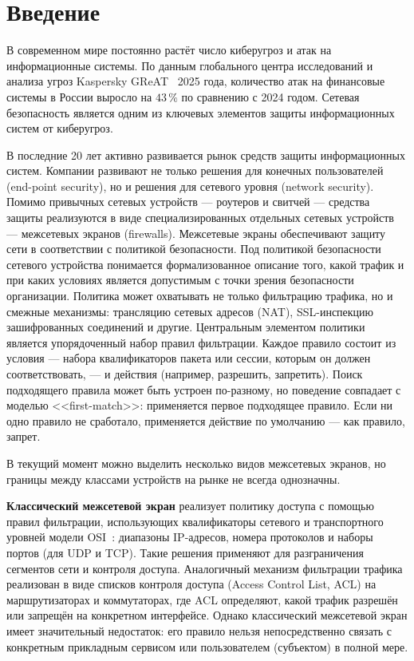 \section{Введение}
\label{sec:Section0} 

В современном мире постоянно растёт число киберугроз и атак на информационные системы. По данным глобального центра исследований и анализа угроз Kaspersky GReAT~\cite{kaspersky2025financial} 2025 года, количество атак на финансовые системы в России выросло на $43\,\%$ по сравнению с 2024 годом. Сетевая безопасность является одним из ключевых элементов защиты информационных систем от киберугроз.

В последние 20 лет активно развивается рынок средств защиты информационных систем. Компании развивают не только решения для конечных пользователей (end-point security), но и решения для сетевого уровня (network security). Помимо привычных сетевых устройств --- роутеров и свитчей --- средства защиты реализуются в виде специализированных отдельных сетевых устройств --- межсетевых экранов (firewalls). Межсетевые экраны обеспечивают защиту сети в соответствии с политикой безопасности. Под политикой безопасности сетевого устройства понимается формализованное описание того, какой трафик и при каких условиях является допустимым с точки зрения безопасности организации. Политика может охватывать не только фильтрацию трафика, но и смежные механизмы: трансляцию сетевых адресов (NAT), SSL-инспекцию зашифрованных соединений и другие. Центральным элементом политики является упорядоченный набор правил фильтрации. Каждое правило состоит из условия — набора квалификаторов пакета или сессии, которым он должен соответствовать, — и действия (например, разрешить, запретить).
Поиск подходящего правила может быть устроен по-разному, но поведение совпадает с моделью <<first-match>>: применяется первое подходящее правило. Если ни одно правило не сработало, применяется действие по умолчанию — как правило, запрет.

В текущий момент можно выделить несколько видов межсетевых экранов, но границы между классами устройств на рынке не всегда однозначны.

\textbf{Классический межсетевой экран} реализует политику доступа с помощью правил фильтрации, использующих квалификаторы сетевого и транспортного уровней модели OSI~\cite{iso7498-1}: диапазоны IP-адресов, номера протоколов и наборы портов (для UDP и TCP). Такие решения применяют для разграничения сегментов сети и контроля доступа. Аналогичный механизм фильтрации трафика реализован в виде списков контроля доступа (Access Control List, ACL) на маршрутизаторах и коммутаторах, где ACL определяют, какой трафик разрешён или запрещён на конкретном интерфейсе. Однако классический межсетевой экран имеет значительный недостаток: его правило нельзя непосредственно связать с конкретным прикладным сервисом или пользователем (субъектом) в полной мере.

